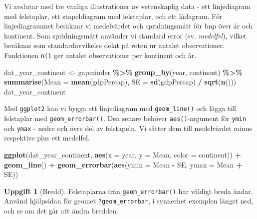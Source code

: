 \documentclass[
]{book}
\newenvironment{Shaded}{\begin{snugshade}}{\end{snugshade}}
\newcommand{\AttributeTok}[1]{\textcolor[rgb]{0.13,0.29,0.53}{#1}}
\newcommand{\FunctionTok}[1]{\textcolor[rgb]{0.13,0.29,0.53}{\textbf{#1}}}
\newcommand{\NormalTok}[1]{#1}
\newcommand{\OtherTok}[1]{\textcolor[rgb]{0.56,0.35,0.01}{#1}}
\newcommand{\SpecialCharTok}[1]{\textcolor[rgb]{0.81,0.36,0.00}{\textbf{#1}}}
\theoremstyle{definition}
\theoremstyle{definition}
\theoremstyle{definition}
\newtheorem{exercise}{Uppgift}[chapter]
\theoremstyle{definition}
\theoremstyle{remark}
\begin{document}
Vi avslutar med tre vanliga illustrationer av vetenskaplig data - ett linjediagram med felstaplar, ett stapeldiagram med felstaplar, och ett lådagram. För linjediagrammet beräknar vi medelvärdet och spridningsmått för bnp över år och kontinent. Som spridningsmått använder vi standard error (sv. \emph{medelfel}), vilket beräknas som standardavvikelse delat på roten ur antalet observationer. Funktionen \texttt{n()} ger antalet observationer per kontinent och år.

\begin{Shaded}
\begin{Highlighting}[]
\NormalTok{dat\_year\_continent }\OtherTok{\textless{}{-}}\NormalTok{ gapminder }\SpecialCharTok{\%\textgreater{}\%}
  \FunctionTok{group\_by}\NormalTok{(year, continent) }\SpecialCharTok{\%\textgreater{}\%}
  \FunctionTok{summarise}\NormalTok{(}\AttributeTok{Mean =} \FunctionTok{mean}\NormalTok{(gdpPercap),}
            \AttributeTok{SE =} \FunctionTok{sd}\NormalTok{(gdpPercap) }\SpecialCharTok{/} \FunctionTok{sqrt}\NormalTok{(}\FunctionTok{n}\NormalTok{()))}
\NormalTok{dat\_year\_continent}
\end{Highlighting}
\end{Shaded}

Med \texttt{ggplot2} kan vi bygga ett linjediagram med \texttt{geom\_line()} och lägga till felstaplar med \texttt{geom\_errorbar()}. Den senare behöver \texttt{aes()}-argument för \texttt{ymin} och \texttt{ymax} - nedre och övre del av felstapeln. Vi sätter dem till medelvärdet minus respektive plus ett medelfel.

\begin{Shaded}
\begin{Highlighting}[]
\FunctionTok{ggplot}\NormalTok{(dat\_year\_continent, }\FunctionTok{aes}\NormalTok{(}\AttributeTok{x =}\NormalTok{ year, }\AttributeTok{y =}\NormalTok{ Mean, }
                               \AttributeTok{color =}\NormalTok{ continent)) }\SpecialCharTok{+}
  \FunctionTok{geom\_line}\NormalTok{() }\SpecialCharTok{+}
  \FunctionTok{geom\_errorbar}\NormalTok{(}\FunctionTok{aes}\NormalTok{(}\AttributeTok{ymin =}\NormalTok{ Mean }\SpecialCharTok{{-}}\NormalTok{ SE, }\AttributeTok{ymax =}\NormalTok{ Mean }\SpecialCharTok{+}\NormalTok{ SE))}
\end{Highlighting}
\end{Shaded}

\begin{exercise}[Bredd]
Felstaplarna från \texttt{geom\_errorbar()} har väldigt breda ändar. Använd hjälpsidan för geomet \texttt{?geom\_errorbar}, i synnerhet exemplen längst ned, och se om det går att ändra bredden.
\end{exercise}
\end{document}
